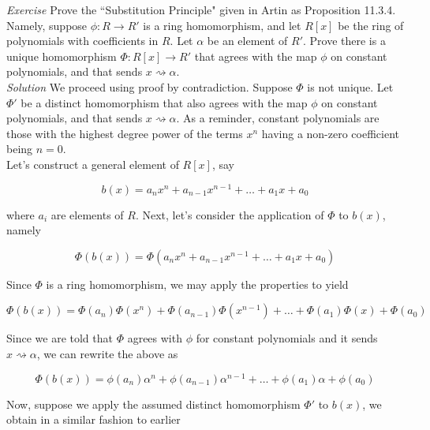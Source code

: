 \textit{Exercise} Prove the ``Substitution Principle"  given in Artin as Proposition 11.3.4.  Namely, suppose $\phi: R \longrightarrow R'$ is a ring homomorphism, and let $R[x]$ be the ring of polynomials with coefficients in $R$.  Let $\alpha$ be an element of $R'$.  Prove there is a unique homomorphism $\Phi: R[x] \longrightarrow R'$ that agrees with the map $\phi$ on constant polynomials, and that sends $x \rightsquigarrow \alpha$.\\

\textit{Solution}  We proceed using proof by contradiction.  Suppose $\Phi$ is not unique.  Let $\Phi'$ be a distinct homomorphism that also agrees with the map $\phi$ on constant polynomials, and that sends $x \rightsquigarrow \alpha$.  As a reminder, constant polynomials are those with the highest degree power of the terms $x^{n}$ having a non-zero coefficient being $n=0$.\\

Let's construct a general element of $R[x]$, say 

\begin{displaymath}
b(x)=a_{n}x^{n}+a_{n-1}x^{n-1}+ \ldots + a_{1}x + a_{0}
\end{displaymath}

where $a_{i}$ are elements of $R$.  Next, let's consider the application of $\Phi$ to $b(x)$, namely

\begin{displaymath}
\Phi(b(x))=\Phi(a_{n}x^{n}+a_{n-1}x^{n-1}+ \ldots + a_{1}x + a_{0})
\end{displaymath}

Since $\Phi$ is a ring homomorphism, we may apply the properties to yield

\begin{displaymath}
\Phi(b(x))=\Phi(a_{n})\Phi(x^{n})+\Phi(a_{n-1})\Phi(x^{n-1})+ \ldots + \Phi(a_{1})\Phi(x) + \Phi(a_{0})
\end{displaymath}

Since we are told that $\Phi$ agrees with $\phi$ for constant polynomials and it sends $x \rightsquigarrow \alpha$, we can rewrite the above as

\begin{displaymath}
\Phi(b(x))=\phi(a_{n})\alpha^{n}+\phi(a_{n-1})\alpha^{n-1}+ \ldots + \phi(a_{1})\alpha + \phi(a_{0})
\end{displaymath}

Now, suppose we apply the assumed distinct homomorphism $\Phi'$ to $b(x)$, we obtain in a similar fashion to earlier

